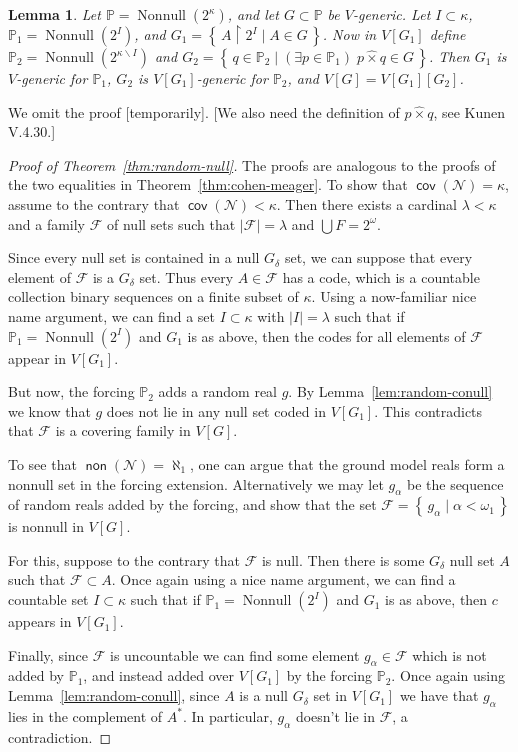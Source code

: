 \documentclass[11pt,oneside]{amsbook}
\newcommand{\set}[1]{\left\{\,#1\,\right\}}
\newcommand{\PP}{\mathbb P}
\newcommand{\Null}{\mathcal N}
\DeclareMathOperator{\non}{\mathsf{non}}
\DeclareMathOperator{\cov}{\mathsf{cov}}
\DeclareMathOperator{\Nonnull}{Nonnull}
\theoremstyle{definition}
\theoremstyle{plain}
\newtheorem{lemma}[theorem]{Lemma}
\theoremstyle{definition}
\theoremstyle{remark}
\numberwithin{equation}{section}
\numberwithin{figure}{section}
\begin{document}
\begin{lemma}
  Let $\PP=\Nonnull(2^\kappa)$, and let $G\subset\PP$ be $V$-generic. Let $I\subset\kappa$, $\PP_1=\Nonnull(2^I)$, and $G_1=\set{A\restriction2^I\mid A\in G}$. Now in $V[G_1]$ define $\PP_2=\Nonnull(2^{\kappa\smallsetminus I})$ and $G_2=\set{q\in\PP_2\mid(\exists p\in\PP_1)\;p\hat{\times} q\in G}$. Then $G_1$ is $V$-generic for $\PP_1$, $G_2$ is $V[G_1]$-generic for $\PP_2$, and $V[G]=V[G_1][G_2]$.
\end{lemma}

We omit the proof [temporarily]. [We also need the definition of $p\hat{\times}q$, see Kunen V.4.30.]

\begin{proof}[Proof of Theorem~\ref{thm:random-null}]
  The proofs are analogous to the proofs of the two equalities in Theorem~\ref{thm:cohen-meager}. To show that $\cov(\Null)=\kappa$, assume to the contrary that $\cov(\Null)<\kappa$. Then there exists a cardinal $\lambda<\kappa$ and a family $\mathcal F$ of null sets such that $|\mathcal F|=\lambda$ and $\bigcup F=2^\omega$.

  Since every null set is contained in a null $G_\delta$ set, we can suppose that every element of $\mathcal F$ is a $G_\delta$ set. Thus every $A\in\mathcal F$ has a code, which is a countable collection binary sequences on a finite subset of $\kappa$. Using a now-familiar nice name argument, we can find a set $I\subset\kappa$ with $|I|=\lambda$ such that if $\PP_1=\Nonnull(2^I)$ and $G_1$ is as above, then the codes for all elements of $\mathcal F$ appear in $V[G_1]$.

  But now, the forcing $\PP_2$ adds a random real $g$. By Lemma~\ref{lem:random-conull} we know that $g$ does not lie in any null set coded in $V[G_1]$. This contradicts that $\mathcal F$ is a covering family in $V[G]$.

  To see that $\non(\Null)=\aleph_1$, one can argue that the ground model reals form a nonnull set in the forcing extension. Alternatively we may let $g_\alpha$ be the sequence of random reals added by the forcing, and show that the set $\mathcal F=\set{g_\alpha\mid\alpha<\omega_1}$ is nonnull in $V[G]$.

  For this, suppose to the contrary that $\mathcal F$ is null. Then there is some $G_\delta$ null set $A$ such that $\mathcal F\subset A$. Once again using a nice name argument, we can find a countable set $I\subset\kappa$ such that if $\PP_1=\Nonnull(2^I)$ and $G_1$ is as above, then $c$ appears in $V[G_1]$.

  Finally, since $\mathcal F$ is uncountable we can find some element $g_\alpha\in\mathcal F$ which is not added by $\PP_1$, and instead added over $V[G_1]$ by the forcing $\PP_2$. Once again using Lemma~\ref{lem:random-conull}, since $A$ is a null $G_\delta$ set in $V[G_1]$ we have that $g_\alpha$ lies in the complement of $A^*$. In particular, $g_\alpha$ doesn't lie in $\mathcal F$, a contradiction.
\end{proof}
\end{document}
